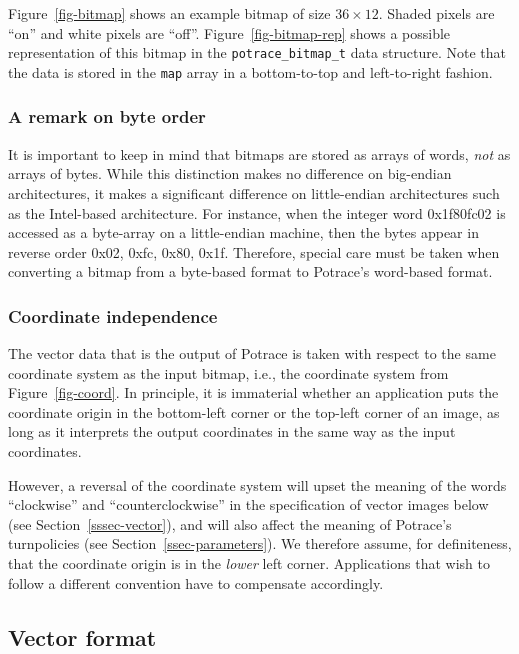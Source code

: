 \documentclass{article}
\begin{document}
Figure~\ref{fig-bitmap} shows an example bitmap of size $36\times 12$.
Shaded pixels are ``on'' and white pixels are ``off''.
Figure~\ref{fig-bitmap-rep} shows a possible representation of this
bitmap in the \verb!potrace_bitmap_t! data structure. Note that the
data is stored in the \verb!map! array in a bottom-to-top and
left-to-right fashion.


\subsubsection{A remark on byte order}

It is important to keep in mind that bitmaps are stored as arrays of
words, {\em not} as arrays of bytes. While this distinction makes no
difference on big-endian architectures, it makes a significant
difference on little-endian architectures such as the Intel-based
architecture. For instance, when the integer word 0x1f80fc02 is
accessed as a byte-array on a little-endian machine, then the bytes
appear in reverse order 0x02, 0xfc, 0x80, 0x1f. Therefore, special
care must be taken when converting a bitmap from a byte-based
format to Potrace's word-based format.

\subsubsection{Coordinate independence}

The vector data that is the output of Potrace is taken with respect
to the same coordinate system as the input bitmap, i.e., the
coordinate system from Figure~\ref{fig-coord}. In principle, it is
immaterial whether an application puts the coordinate origin in the
bottom-left corner or the top-left corner of an image, as long as it
interprets the output coordinates in the same way as the input
coordinates.

However, a reversal of the coordinate system will upset the meaning of
the words ``clockwise'' and ``counterclockwise'' in the specification
of vector images below (see Section~\ref{sssec-vector}), and will also
affect the meaning of Potrace's turnpolicies (see
Section~\ref{ssec-parameters}). We therefore assume, for definiteness,
that the coordinate origin is in the {\em lower} left corner.
Applications that wish to follow a different convention have to
compensate accordingly.

\subsection{Vector format}
\end{document}
